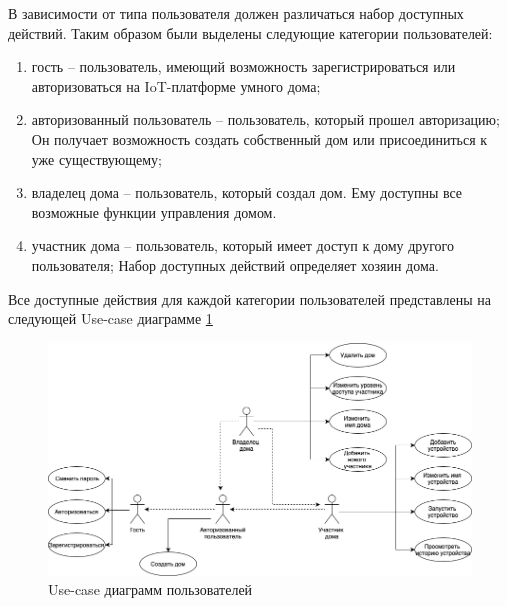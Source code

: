 В зависимости от типа пользователя должен различаться набор доступных действий. Таким 
образом были выделены следующие категории пользователей:

\begin{enumerate}
    \item гость -- пользователь, имеющий возможность 
    зарегистрироваться или авторизоваться на IoT-платформе умного дома;
    \item авторизованный пользователь -- пользователь, который прошел авторизацию;
    Он получает возможность создать собственный дом или присоединиться к уже существующему;
    \item владелец дома -- пользователь, который создал дом. Ему доступны все возможные функции управления домом.
    \item участник дома -- пользователь, который имеет доступ к дому другого пользователя;
    Набор доступных действий определяет хозяин дома.
\end{enumerate}

Все доступные действия для каждой категории пользователей представлены на следующей Use-case диаграмме \ref{img:iot}
\begin{figure}[h]
    \includegraphics[width=0.9\linewidth]{img/ucd.png}
    \caption{Use-case диаграмм пользователей}
    \label{img:iot}
\end{figure}
\clearpage

